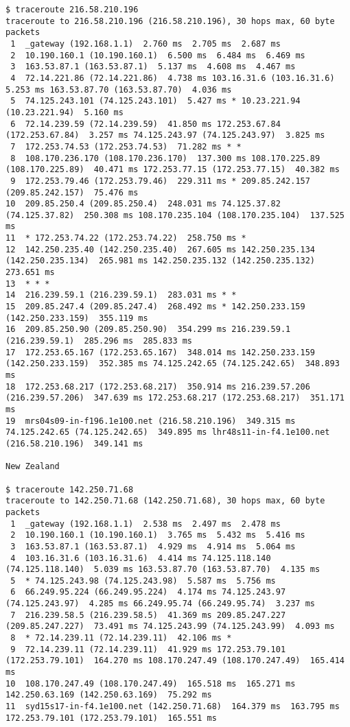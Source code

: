 \documentclass[a4paper]{article}
\begin{document}
\begin{lstlisting}
$ traceroute 216.58.210.196
traceroute to 216.58.210.196 (216.58.210.196), 30 hops max, 60 byte packets
 1  _gateway (192.168.1.1)  2.760 ms  2.705 ms  2.687 ms
 2  10.190.160.1 (10.190.160.1)  6.500 ms  6.484 ms  6.469 ms
 3  163.53.87.1 (163.53.87.1)  5.137 ms  4.608 ms  4.467 ms
 4  72.14.221.86 (72.14.221.86)  4.738 ms 103.16.31.6 (103.16.31.6)  5.253 ms 163.53.87.70 (163.53.87.70)  4.036 ms
 5  74.125.243.101 (74.125.243.101)  5.427 ms * 10.23.221.94 (10.23.221.94)  5.160 ms
 6  72.14.239.59 (72.14.239.59)  41.850 ms 172.253.67.84 (172.253.67.84)  3.257 ms 74.125.243.97 (74.125.243.97)  3.825 ms
 7  172.253.74.53 (172.253.74.53)  71.282 ms * *
 8  108.170.236.170 (108.170.236.170)  137.300 ms 108.170.225.89 (108.170.225.89)  40.471 ms 172.253.77.15 (172.253.77.15)  40.382 ms
 9  172.253.79.46 (172.253.79.46)  229.311 ms * 209.85.242.157 (209.85.242.157)  75.476 ms
10  209.85.250.4 (209.85.250.4)  248.031 ms 74.125.37.82 (74.125.37.82)  250.308 ms 108.170.235.104 (108.170.235.104)  137.525 ms
11  * 172.253.74.22 (172.253.74.22)  258.750 ms *
12  142.250.235.40 (142.250.235.40)  267.605 ms 142.250.235.134 (142.250.235.134)  265.981 ms 142.250.235.132 (142.250.235.132)  273.651 ms
13  * * *
14  216.239.59.1 (216.239.59.1)  283.031 ms * *
15  209.85.247.4 (209.85.247.4)  268.492 ms * 142.250.233.159 (142.250.233.159)  355.119 ms
16  209.85.250.90 (209.85.250.90)  354.299 ms 216.239.59.1 (216.239.59.1)  285.296 ms  285.833 ms
17  172.253.65.167 (172.253.65.167)  348.014 ms 142.250.233.159 (142.250.233.159)  352.385 ms 74.125.242.65 (74.125.242.65)  348.893 ms
18  172.253.68.217 (172.253.68.217)  350.914 ms 216.239.57.206 (216.239.57.206)  347.639 ms 172.253.68.217 (172.253.68.217)  351.171 ms
19  mrs04s09-in-f196.1e100.net (216.58.210.196)  349.315 ms 74.125.242.65 (74.125.242.65)  349.895 ms lhr48s11-in-f4.1e100.net (216.58.210.196)  349.141 ms

New Zealand

$ traceroute 142.250.71.68
traceroute to 142.250.71.68 (142.250.71.68), 30 hops max, 60 byte packets
 1  _gateway (192.168.1.1)  2.538 ms  2.497 ms  2.478 ms
 2  10.190.160.1 (10.190.160.1)  3.765 ms  5.432 ms  5.416 ms
 3  163.53.87.1 (163.53.87.1)  4.929 ms  4.914 ms  5.064 ms
 4  103.16.31.6 (103.16.31.6)  4.414 ms 74.125.118.140 (74.125.118.140)  5.039 ms 163.53.87.70 (163.53.87.70)  4.135 ms
 5  * 74.125.243.98 (74.125.243.98)  5.587 ms  5.756 ms
 6  66.249.95.224 (66.249.95.224)  4.174 ms 74.125.243.97 (74.125.243.97)  4.285 ms 66.249.95.74 (66.249.95.74)  3.237 ms
 7  216.239.58.5 (216.239.58.5)  41.369 ms 209.85.247.227 (209.85.247.227)  73.491 ms 74.125.243.99 (74.125.243.99)  4.093 ms
 8  * 72.14.239.11 (72.14.239.11)  42.106 ms *
 9  72.14.239.11 (72.14.239.11)  41.929 ms 172.253.79.101 (172.253.79.101)  164.270 ms 108.170.247.49 (108.170.247.49)  165.414 ms
10  108.170.247.49 (108.170.247.49)  165.518 ms  165.271 ms 142.250.63.169 (142.250.63.169)  75.292 ms
11  syd15s17-in-f4.1e100.net (142.250.71.68)  164.379 ms  163.795 ms 172.253.79.101 (172.253.79.101)  165.551 ms


\end{lstlisting}
\end{document}
